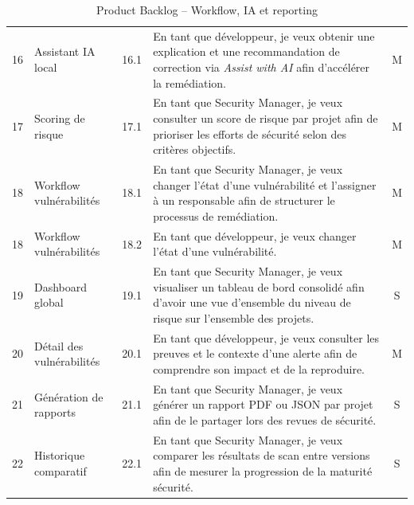 \begin{table}[H]
\centering
\caption{Product Backlog -- Workflow, IA et reporting}
\label{tab:backlog-ia-notifications}
\small
\renewcommand{\arraystretch}{1.2}
\begin{tabularx}{\textwidth}{c X c X c} \\
\hline
16 & Assistant IA local & 16.1
  & En tant que développeur, je veux obtenir une explication et une recommandation
    de correction via \textit{Assist with AI} afin d'accélérer la remédiation. & M \\
17 & Scoring de risque & 17.1
  & En tant que Security Manager, je veux consulter un score de risque par projet
    afin de prioriser les efforts de sécurité selon des critères objectifs. & M \\
18 & Workflow vulnérabilités & 18.1
  & En tant que Security Manager, je veux changer l'état d'une vulnérabilité et l'assigner
    à un responsable afin de structurer le processus de remédiation. & M \\
18 & Workflow vulnérabilités & 18.2
  & En tant que développeur, je veux changer l'état d'une vulnérabilité. & M \\
19 & Dashboard global & 19.1
  & En tant que Security Manager, je veux visualiser un tableau de bord consolidé
    afin d'avoir une vue d'ensemble du niveau de risque sur l'ensemble des projets. & S \\
20 & Détail des vulnérabilités & 20.1
  & En tant que développeur, je veux consulter les preuves et le contexte d'une
    alerte afin de comprendre son impact et de la reproduire. & M \\
21 & Génération de rapports & 21.1
  & En tant que Security Manager, je veux générer un rapport PDF ou JSON par projet
    afin de le partager lors des revues de sécurité. & S \\
22 & Historique comparatif & 22.1
  & En tant que Security Manager, je veux comparer les résultats de scan entre
    versions afin de mesurer la progression de la maturité sécurité. & S \\
\hline
\end{tabularx}
\end{table}

